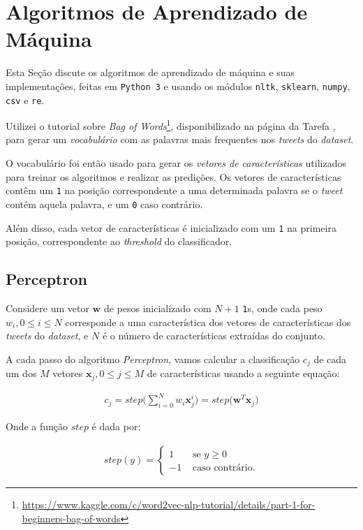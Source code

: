 \documentclass[a4paper, 12pt]{article}
\newcommand{\rom}[1]{\uppercase\expandafter{\romannumeral #1\relax}}
\begin{document}
\section{Algoritmos de Aprendizado de Máquina}

Esta Seção discute os algoritmos de aprendizado de máquina
e suas implementações, feitas em \texttt{Python 3} e usando os
módulos \texttt{nltk}, \texttt{sklearn}, \texttt{numpy},
\texttt{csv} e \texttt{re}.

Utilizei o tutorial sobre \textit{Bag of
Words}\footnote{\url{https://www.kaggle.com/c/word2vec-nlp-tutorial/details/part-1-for-beginners-bag-of-words}},
disponibilizado na página da Tarefa \rom{1}, para gerar um \textit{vocabulário}
com as palavras mais frequentes nos \textit{tweets} do \textit{dataset}.

O vocabulário foi então usado para gerar os \textit{vetores de características}
utilizados para treinar os algoritmos e realizar as predições.
Os vetores de características contêm um \texttt{1} na posição
correspondente a uma determinada palavra se o \textit{tweet}
contém aquela palavra, e um \texttt{0} caso contrário.

Além disso, cada vetor de características é inicializado com
um \texttt{1} na primeira posição, correspondente ao
\textit{threshold} do classificador.

\subsection{Perceptron} \label{sec:percep}

Considere um vetor $\boldsymbol{w}$ de pesos inicializado com $N + 1$
\texttt{1}s, onde cada peso $w_i, 0 \leq i \leq N$ corresponde a uma
característica dos vetores de características dos \textit{tweets} do
\textit{dataset}, e $N$ é o número de características extraídas do conjunto.

A cada passo do algoritmo \textit{Perceptron}, vamos calcular a classificação
$c_j$ de cada um dos $M$ vetores $\boldsymbol{x}_j, 0 \leq j \leq M$ de características
usando a seguinte equação:

\begin{align*}
    c_j = step\bigg(\sum_{i = 0}^{N}{w_i\boldsymbol{x}_{j}^{i}}\bigg) = step\bigg(\boldsymbol{w}^{T}\boldsymbol{x}_j\bigg)
\end{align*}

Onde a função $step$ é dada por:

\begin{align*}
    step(y) = \begin{cases}
        1 & \text{ se } y \geq 0 \\
        -1 & \text{ caso contrário.}
    \end{cases}
\end{align*}
\end{document}

